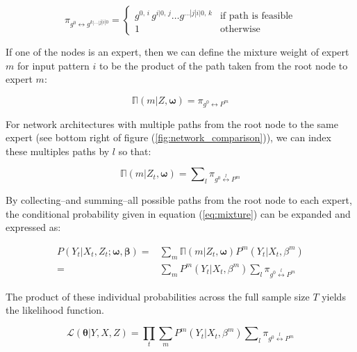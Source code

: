 \documentclass[12pt]{article}
\newcommand{\gateprod}[2]{\pi_{#1 \longleftrightarrow #2}}
\newcommand{\sumgateprod}[3]{\pi_{#1 \overset{#3}{\longleftrightarrow} #2}}
\newcommand{\shortsum}[1]{\sum \nolimits_{#1}}
\newcommand{\expmixwt}[0]{\mathbb{\Pi}}
\begin{document}
\begin{equation} \label{eq:gpath}
  \gateprod{g^{0}}{g^{k|\ldots|j|i|0}} =
    \begin{cases} 
       g^{0, \, i} \, g^{i|0, \, j} \ldots g^{\dots|j|i|0, \, k} & \textrm{if path is feasible} \\
       1 & \textrm{otherwise}
    \end{cases}
\end{equation}

If one of the nodes is an expert, then we can define the mixture weight
of expert $m$ for input pattern $i$ to be the product of the path taken
from the root node to expert $m$:

\begin{equation} \label{eq:gpath2}
  \expmixwt(m | Z, \boldsymbol{\omega}) = \gateprod{g^{0}}{P^{m}}
\end{equation}

For network architectures with multiple paths from the root node to
the same expert (see bottom right of figure (\ref{fig:network_comparison})),
we can index these multiples paths by $l$ so that:

\begin{equation} \label{eq:pathsums}
  \expmixwt(m | Z_{t}, \boldsymbol{\omega}) = \shortsum{l} \sumgateprod{g^{0}}{P^{m}}{l} 
\end{equation}


By collecting--and summing--all possible paths from the root node to each
expert, the conditional probability given in equation (\ref{eq:mixture}) can be
expanded and expressed as:

\begin{equation} \label{eq:contribution}
  \begin{split}
    P(Y_{t}|X_{t}, Z_{t}; \boldsymbol{\omega}, \boldsymbol{\beta}) =& \sum_{m} \expmixwt(m | Z_{t}, \boldsymbol{\omega}) P^{m}(Y_{t}|X_{t},\beta^{m}) \\ 
      =& \sum_{m} P^{m}(Y_{t}|X_{t}, \beta^{m}) \shortsum{l} \sumgateprod{g^{0}}{P^{m}}{l}
  \end{split}
\end{equation}

The product of these individual probabilities across the full sample size $T$ yields
the likelihood function.

\begin{equation} \label{eq:likelihood}
  \mathcal{L}(\boldsymbol{\theta}| Y, X, Z) = \prod_{t}\sum_{m}P^{m}(Y_{t}|X_{t}, \beta^{m}) \shortsum{l} \sumgateprod{g^{0}}{P^{m}}{l}
\end{equation}
\end{document}
